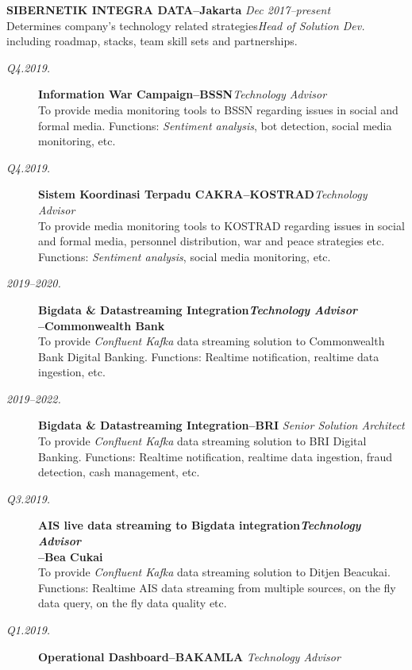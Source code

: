 \documentclass[12pt]{res} %
\begin{document}
\begin{resume}
\vspace{8pt} %
{\bf \uppercase{Sibernetik Integra Data}--Jakarta} \hfill {\sl Dec 2017--present} \\
Determines company's technology related strategies\hfill {\sl Head of Solution Dev.}\\including roadmap, stacks, team skill sets and partnerships.

\vspace{10pt} 
\begin{description}
    \item[{\sl Q4.2019.}] {\bf Information War Campaign--BSSN}\hfill {\sl Technology Advisor}\\
    To provide media monitoring tools to BSSN regarding issues in social and formal media. Functions: {\sl Sentiment analysis}, bot detection,
    social media monitoring, etc.
    \item[{\sl Q4.2019.}] {\bf Sistem Koordinasi Terpadu CAKRA--KOSTRAD}\hfill {\sl Technology Advisor}\\
    To provide media monitoring tools to KOSTRAD regarding issues in social and formal media, personnel distribution, war and peace strategies etc.
    Functions: {\sl Sentiment analysis}, social media monitoring, etc.
    \item[{\sl 2019--2020.}] {\bf Bigdata \& Datastreaming Integration\hfill {\sl Technology Advisor}\\--Commonwealth Bank}\\
    To provide {\sl Confluent Kafka} data streaming solution to Commonwealth Bank Digital Banking. Functions: Realtime notification, realtime data ingestion, etc.
    \item[{\sl 2019--2022.}] {\bf Bigdata \& Datastreaming Integration--BRI} \hfill {\sl Senior Solution Architect}\\
    To provide {\sl Confluent Kafka} data streaming solution to BRI Digital Banking. Functions: Realtime notification, realtime data ingestion, fraud detection,
    cash management, etc.
    \item[{\sl Q3.2019.}] {\bf AIS live data streaming to Bigdata integration\hfill {\sl Technology Advisor}\\--Bea Cukai}\\
    To provide {\sl Confluent Kafka} data streaming solution to Ditjen Beacukai. Functions: Realtime AIS data streaming from multiple sources, on the fly data query,
    on the fly data quality etc.
    \item[{\sl Q1.2019.}] {\bf Operational Dashboard--BAKAMLA} \hfill {\sl Technology Advisor}\\

\end{description}
\end{resume}
\end{document}
